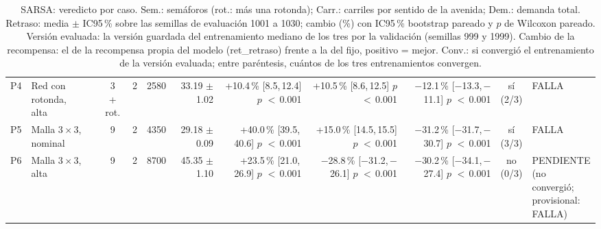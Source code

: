 \begin{table}[H]
\begin{tabular}{llcrrrrrrcl}
P4 & \makecell[l]{Red con\\{}rotonda,\\{}alta} & \makecell[c]{3\\{}+ rot.} & 2 & 2580 & \makecell[r]{33.19\\{}$\pm$ 1.02} & \makecell[r]{+10.4\,\%\\{}[8.5,\,12.4]\\$p$ $<$\,0.001} & \makecell[r]{+10.5\,\%\\{}[8.6,\,12.5]\\$p$ $<$\,0.001} & \makecell[r]{$-$12.1\,\%\\{}[$-$13.3,\,$-$11.1]\\$p$ $<$\,0.001} & \makecell[c]{sí\\{}(2/3)} & FALLA \\
P5 & \makecell[l]{Malla $3 \times 3$,\\{}nominal} & 9 & 2 & 4350 & \makecell[r]{29.18\\{}$\pm$ 0.09} & \makecell[r]{+40.0\,\%\\{}[39.5,\,40.6]\\$p$ $<$\,0.001} & \makecell[r]{+15.0\,\%\\{}[14.5,\,15.5]\\$p$ $<$\,0.001} & \makecell[r]{$-$31.2\,\%\\{}[$-$31.7,\,$-$30.7]\\$p$ $<$\,0.001} & \makecell[c]{sí\\{}(3/3)} & FALLA \\
P6 & \makecell[l]{Malla $3 \times 3$,\\{}alta} & 9 & 2 & 8700 & \makecell[r]{45.35\\{}$\pm$ 1.10} & \makecell[r]{+23.5\,\%\\{}[21.0,\,26.9]\\$p$ $<$\,0.001} & \makecell[r]{$-$28.8\,\%\\{}[$-$31.2,\,$-$26.1]\\$p$ $<$\,0.001} & \makecell[r]{$-$30.2\,\%\\{}[$-$34.1,\,$-$27.4]\\$p$ $<$\,0.001} & \makecell[c]{no\\{}(0/3)} & \makecell[l]{PENDIENTE\\{}(no convergió;\\{}provisional:\\{}FALLA)} \\
\bottomrule
\end{tabular}
\caption[Veredicto de SARSA]{SARSA: veredicto por caso. Sem.: semáforos (rot.: más una rotonda); Carr.: carriles por sentido de la avenida; Dem.: demanda total. Retraso: media $\pm$ IC95\,\% sobre las semillas de evaluación 1001 a 1030; cambio (\%) con IC95\,\% bootstrap pareado y $p$ de Wilcoxon pareado. Versión evaluada: la versión guardada del entrenamiento mediano de los tres por la validación (semillas 999 y 1999). Cambio de la recompensa: el de la recompensa propia del modelo (ret\_retraso) frente a la del fijo, positivo = mejor. Conv.: si convergió el entrenamiento de la versión evaluada; entre paréntesis, cuántos de los tres entrenamientos convergen.}
\label{tab:veredicto-sarsa}
\end{table}
